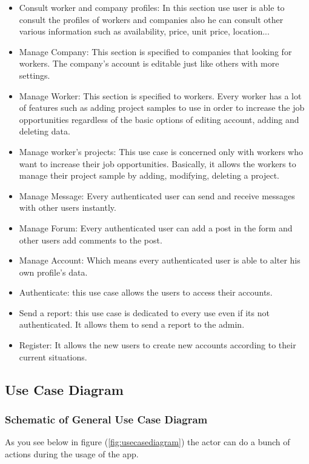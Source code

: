 \documentclass[12pt]{report}
\begin{document}
\begin{itemize}
    \item Consult worker and company profiles: In this section use user is able to consult the profiles of workers and companies also he can consult other various information such as availability, price, unit price, location...
    \item Manage Company: This section is specified to companies that looking for workers. The company's account is editable just like others with more settings.
    \item Manage Worker: This section is specified to workers. Every worker has a lot of features such as adding project samples to use in order to increase the job opportunities regardless of the basic options of editing account, adding and deleting data.
    \item Manage worker's projects: This use case is concerned only with workers who want to increase their job opportunities. Basically, it allows the workers to manage their project sample by adding, modifying, deleting a project.
    \item Manage Message: Every authenticated user can send and receive messages with other users instantly.
    \item Manage Forum: Every authenticated user can add a post in the form and other users add comments to the post.
    \item Manage Account: Which means every authenticated user is able to alter his own profile's data.
    \item Authenticate: this use case allows the users to access their accounts.
    \item Send a report: this use case is dedicated to every use even if its not authenticated. It allows them to send a report to the admin.
    \item Register: It allows the new users to create new accounts according to their current situations.
\end{itemize}
\pagebreak
\subsection{Use Case Diagram}


\subsubsection*{Schematic of General Use Case Diagram}
As you see below in figure (\ref{fig:usecasediagram}) the actor can do a bunch of actions during the usage of the app.
\end{document}
